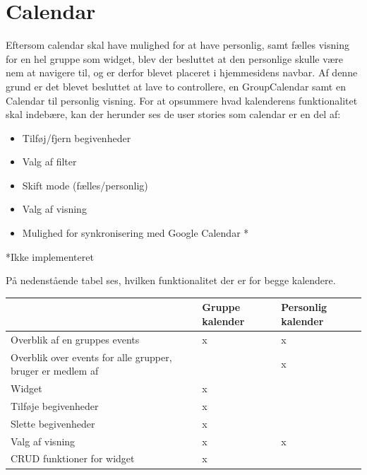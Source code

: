 \section{Calendar}

Eftersom calendar skal have mulighed for at have personlig, samt fælles visning for en hel gruppe som widget, blev der besluttet at den personlige skulle være nem at navigere til, og er derfor blevet placeret i hjemmesidens navbar. Af denne grund er det blevet besluttet at lave to controllere, en GroupCalendar samt en Calendar til personlig visning. For at opsummere hvad kalenderens funktionalitet skal indebære, kan der herunder ses de user stories som calendar er en del af:

\begin{itemize}
    \item Tilføj/fjern begivenheder
    \item Valg af filter
    \item Skift mode (fælles/personlig)
    \item Valg af visning
    \item Mulighed for synkronisering med Google Calendar *
\end{itemize}

*Ikke implementeret

På nedenstående tabel ses, hvilken funktionalitet der er for begge kalendere.



\noindent  
\begin{tabular}{|p{2.0in}|p{1.5in}|p{1.5in}|} \hline 
\textbf{} & \textbf{Gruppe kalender} & \textbf{Personlig kalender}\\ \hline 
Overblik af en gruppes events & x & x \\ \hline
Overblik over events for alle grupper, bruger er medlem af &  & x \\ \hline 
Widget & x &  \\ \hline 
Tilf{\o}je begivenheder & x &  \\ \hline 
Slette begivenheder & x & \\ \hline 
Valg af visning & x & x \\ \hline
CRUD funktioner for widget & x &  \\ \hline
\end{tabular}
\noindent 



